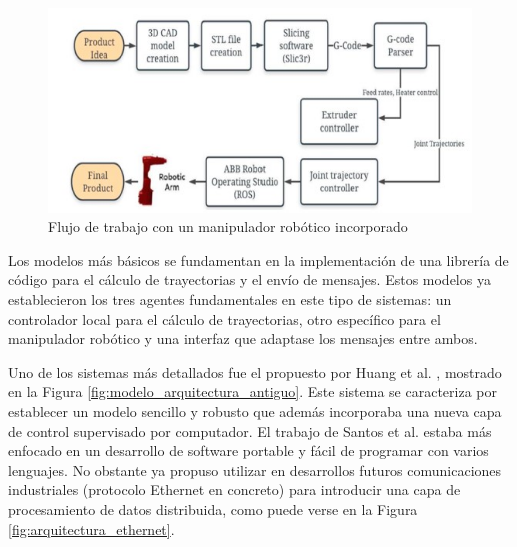 \begin{figure}[h!]
    \centering
    \includegraphics[scale=0.5]{figuras/flujo_trabajo_robot.jpg}
    \caption{Flujo de trabajo con un manipulador robótico incorporado \cite{Kubalak2016}}
    \label{fig:flujo_trabajo_robot}
\end{figure}

Los modelos más básicos se fundamentan en la implementación de una librería de código para el cálculo de trayectorias y el envío de mensajes. Estos modelos ya establecieron los tres agentes fundamentales en este tipo de sistemas: un controlador local para el cálculo de trayectorias, otro específico para el manipulador robótico y una interfaz que adaptase los mensajes entre ambos.

Uno de los sistemas más detallados fue el propuesto por Huang et al. \cite{Huang_2003}, mostrado en la Figura \ref{fig:modelo_arquitectura_antiguo}. Este sistema se caracteriza por establecer un modelo sencillo y robusto que además incorporaba una nueva capa de control supervisado por computador. El trabajo de Santos et al. \cite{Santos_2005} estaba más enfocado en un desarrollo de software portable y fácil de programar con varios lenguajes. No obstante ya propuso utilizar en desarrollos futuros comunicaciones industriales (protocolo Ethernet en concreto) para introducir una capa de procesamiento de datos distribuida, como puede verse en la Figura \ref{fig:arquitectura_ethernet}.

